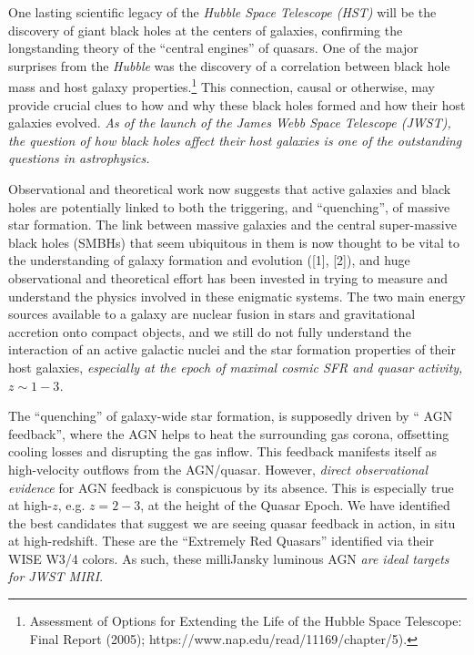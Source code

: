 One lasting scientific legacy of the {\it Hubble Space Telescope
(HST)} will be the discovery of giant black holes at the centers of
galaxies, confirming the longstanding theory of the ``central
engines'' of quasars.  One of the major surprises from the {\it
Hubble} was the discovery of a correlation between black hole mass and
host galaxy properties.\footnote{Assessment of Options for Extending
the Life of the Hubble Space Telescope: Final Report (2005);
https://www.nap.edu/read/11169/chapter/5).}  This connection, causal
or otherwise, may provide crucial clues to how and why these black
holes formed and how their host galaxies evolved. {\it As of the
launch of the James Webb Space Telescope (JWST), the question of how
black holes affect their host galaxies is one of the outstanding
questions in astrophysics.}

\smallskip \smallskip
\noindent
Observational and theoretical work now suggests that active galaxies
and black holes are potentially linked to both the triggering, and
``quenching'', of massive star formation. The link between massive
galaxies and the central super-massive black holes (SMBHs) that seem
ubiquitous in them is now thought to be vital to the understanding of
galaxy formation and evolution ([1], [2]), and huge observational and
theoretical effort has been invested in trying to measure and
understand the physics involved in these enigmatic systems.  The two
main energy sources available to a galaxy are nuclear fusion in stars
and gravitational accretion onto compact objects, and we still do not
fully understand the interaction of an active galactic nuclei and the
star formation properties of their host galaxies, {\it especially at
the epoch of maximal cosmic SFR and quasar activity, $z\sim1-3$.}

\smallskip \smallskip
\noindent
The ``quenching'' of galaxy-wide star formation, is supposedly driven
by `` AGN feedback'', where the AGN helps to heat the surrounding gas
corona, offsetting cooling losses and disrupting the gas inflow. This
feedback manifests itself as high-velocity outflows from the
AGN/quasar.  However, {\it direct observational evidence} for AGN
feedback is conspicuous by its absence. This is especially true at
high-$z$, e.g. $z=2-3$, at the height of the Quasar Epoch.  We have
identified the best candidates that suggest we are seeing quasar
feedback in action, in situ at high-redshift. These are the
``Extremely Red Quasars'' identified via their WISE W3/4 colors.  As
such, these milliJansky luminous AGN {\it are ideal targets for JWST
MIRI}.



